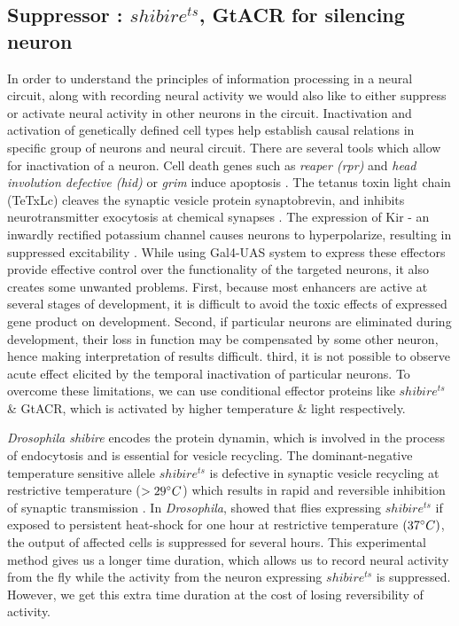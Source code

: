 \subsection{Suppressor : $shibire^{ts}$, GtACR for silencing neuron}
In order to understand the principles of information processing in a neural circuit, along with recording neural activity we would also like to either suppress or activate neural activity in other neurons in the circuit. Inactivation and activation of genetically defined cell types help establish causal relations in specific group of neurons and neural circuit. There are several tools which allow for inactivation of a neuron. Cell death genes such as \textit{reaper (rpr)} and \textit{head involution defective (hid)} or \textit{grim} induce apoptosis \parencite{Chen1996, Grether1995}.  The tetanus toxin light chain (TeTxLc) cleaves the synaptic vesicle protein synaptobrevin, and inhibits neurotransmitter exocytosis at chemical synapses \parencite{Sweeney1995}. The expression of Kir - an inwardly rectified potassium channel causes neurons to hyperpolarize, resulting in suppressed excitability \parencite{Johns1999}. While using Gal4-UAS system to express these effectors provide effective control over the functionality of the targeted neurons, it also creates some unwanted problems. First, because most enhancers are active at several stages of development, it is difficult to avoid the toxic effects of expressed gene product on development. Second, if particular neurons are eliminated during development, their loss in function may be compensated by some other neuron, hence making interpretation of results difficult. third, it is not possible to observe acute effect elicited by the temporal inactivation of particular neurons. To overcome these limitations, we can use conditional effector proteins like $shibire^{ts}$ \& GtACR, which is activated by higher temperature \& light respectively. 

\textit{Drosophila shibire} encodes the protein dynamin, which is involved in the process of endocytosis and is essential for vesicle recycling. The dominant-negative temperature sensitive allele $shibire^{ts}$ is defective in synaptic vesicle recycling at restrictive temperature ($>29\degree C$) which results in rapid and reversible inhibition of synaptic transmission \parencite{Toshihiro2001}. In \textit{Drosophila}, \cite{Joesch2010} showed that flies expressing $shibire^{ts}$ if exposed to persistent heat-shock for one hour at restrictive temperature $(37\degree C)$, the output of affected cells is suppressed for several hours. This experimental method gives us a longer time duration, which allows us to record neural activity from the fly while the activity from the neuron expressing $shibire^{ts}$ is suppressed. However, we get this extra time duration at the cost of losing reversibility of activity.

